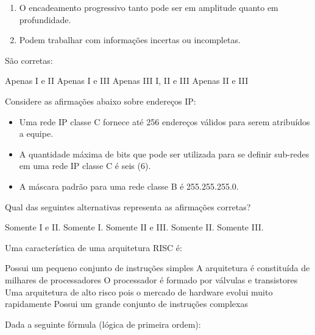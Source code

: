\documentclass[12pt, addpoints]{exam}
\begin{document}
\begin{questions}
\begin{enumerate}[label=\Roman*.]
    \item O encadeamento progressivo tanto pode ser em amplitude quanto em profundidade.

    \item Podem trabalhar com informações incertas ou incompletas. 

\end{enumerate}

São corretas:
\begin{choices}
\choice Apenas I e II
\choice Apenas I e III
\choice Apenas III
\choice I, II e III
\choice Apenas II e III
\end{choices}

\question

Considere as afirmações abaixo sobre endereços IP:

\begin{itemize}

    \item[I.] Uma rede IP classe C fornece até 256 endereços válidos para serem atribuídos a equipe.

    \item[II.] A quantidade máxima de bits que pode ser utilizada para se definir sub-redes em uma rede IP classe C é seis (6).

    \item[III.] A máscara padrão para uma rede classe B é 255.255.255.0.

\end{itemize}

Qual das seguintes alternativas representa as afirmações corretas?
\begin{choices}
\choice Somente I e II.
\choice Somente I.
\choice Somente II e III.
\choice Somente II.
\choice Somente III.
\end{choices}

\question

Uma característica de uma arquitetura RISC é:
\begin{choices}
\choice Possui um pequeno conjunto de instruções simples
\choice A arquitetura é constituída de milhares de processadores
\choice O processador é formado por válvulas e transistores
\choice Uma arquitetura de alto risco pois o mercado de hardware evolui muito rapidamente
\choice Possui um grande conjunto de instruções complexas
\end{choices}

\question

Dada a seguinte fórmula (lógica de primeira ordem):\\


\end{questions}
\end{document}
